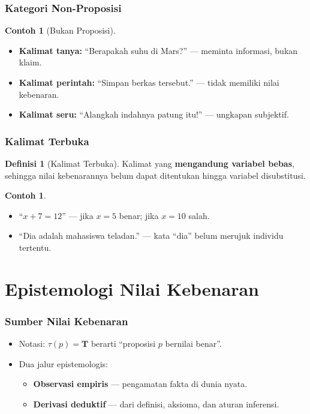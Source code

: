 \documentclass[handout]{beamer}
\theoremstyle{definition}
\newtheorem{definisi}[theorem]{Definisi}
\theoremstyle{example}
\newtheorem{contoh}[theorem]{Contoh}
\begin{document}
\begin{frame}
\frametitle{Kategori Non-Proposisi}
\begin{contoh}[Bukan Proposisi]
\begin{itemize}
  \item \textbf{Kalimat tanya:} ``Berapakah suhu di Mars?'' --- meminta informasi, bukan klaim.
  \item \textbf{Kalimat perintah:} ``Simpan berkas tersebut.'' --- tidak memiliki nilai kebenaran.
  \item \textbf{Kalimat seru:} ``Alangkah indahnya patung itu!'' --- ungkapan subjektif.
\end{itemize}
\end{contoh}
\end{frame}

\begin{frame}
\frametitle{Kalimat Terbuka}
\begin{definisi}[Kalimat Terbuka]
Kalimat yang \textbf{mengandung variabel bebas}, sehingga nilai kebenarannya belum dapat ditentukan hingga variabel disubstitusi.
\end{definisi}
\begin{contoh}
\begin{itemize}
  \item ``$x + 7 = 12$'' --- jika $x = 5$ benar; jika $x = 10$ salah.
  \item ``Dia adalah mahasiswa teladan.'' --- kata ``dia'' belum merujuk individu tertentu.
\end{itemize}
\end{contoh}
\end{frame}

\section{Epistemologi Nilai Kebenaran}

\begin{frame}
\frametitle{Sumber Nilai Kebenaran}
\begin{itemize}
  \item Notasi: $\tau(p) = \mathbf{T}$ berarti ``proposisi $p$ bernilai benar''.
  \item Dua jalur epistemologis:
  \begin{itemize}
    \item \textbf{Observasi empiris} --- pengamatan fakta di dunia nyata.
    \item \textbf{Derivasi deduktif} --- dari definisi, aksioma, dan aturan inferensi.
  \end{itemize}
\end{itemize}
\end{frame}
\end{document}
